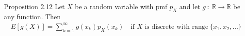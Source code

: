 %

\begin{boks}{Proposition 2.12}
  Let $X$ be a random variable with pmf $p_X$ and let $g \ : \ \mathbb{R} \rightarrow \mathbb{R}$ be any function. Then
  \begin{align*}
    E[g(X)] = \sum_{k = 1}^\infty g(x_k)p_X(x_k) \quad \text{if $X$ is discrete with range} \ \{x_1, x_2, \ldots\}
  \end{align*}
\end{boks}

%

